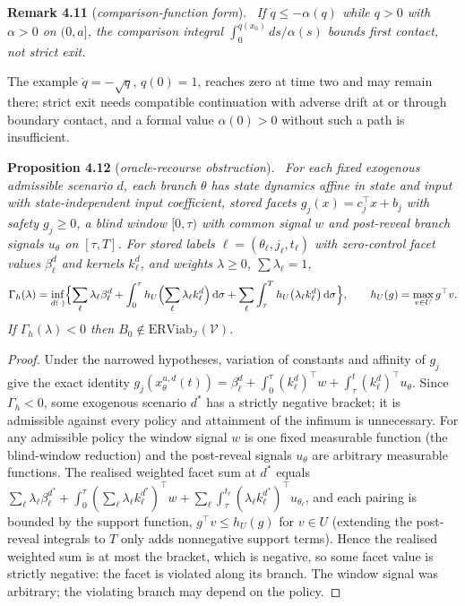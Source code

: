 \documentclass[11pt,a4paper]{article}
\theoremstyle{plain}
\theoremstyle{definition}
\theoremstyle{remark}
\newenvironment{restated}[2]{\par\medskip\noindent\textbf{#1} (\textit{#2}).\ \itshape}{\par\medskip}
\newcommand{\ERViab}{\mathrm{ERViab}}
\newcommand{\cV}{\mathcal{V}}
\newcommand{\cI}{\mathcal{I}}
\newcommand{\dd}{\,\mathrm{d}}
\begin{document}
\begin{restated}{Remark 4.11}{comparison-function form}
If $\dot q\le-\alpha(q)$ while $q>0$ with $\alpha>0$ on $(0,a]$, the comparison integral $\int_0^{q(x_0)}ds/\alpha(s)$ bounds first contact, not strict exit.
\end{restated}

The example $\dot q=-\sqrt q$, $q(0)=1$, reaches zero at time two and may remain there; strict exit needs compatible continuation with adverse drift at or through boundary contact, and a formal value $\alpha(0)>0$ without such a path is insufficient.

\begin{restated}{Proposition 4.12}{oracle-recourse obstruction}
For each fixed exogenous admissible scenario $d$, each branch $\theta$ has state dynamics affine in state and input with state-independent input coefficient, stored facets $g_j(x)=c_j^\top x+b_j$ with safety $g_j\ge0$, a blind window $[0,\tau)$ with common signal $w$ and post-reveal branch signals $u_\theta$ on $[\tau,T]$. For stored labels $\ell=(\theta_\ell,j_\ell,t_\ell)$ with zero-control facet values $\beta^d_\ell$ and kernels $k^d_\ell$, and weights $\lambda\ge0$, $\sum\lambda_\ell=1$,
\[
\Gamma_h(\lambda)=\inf_{d(\cdot)}\Bigl\{\sum_\ell\lambda_\ell\beta^d_\ell+\int_0^\tau h_U\Bigl(\sum_\ell\lambda_\ell k^d_\ell\Bigr)\dd\sigma+\sum_\ell\int_\tau^{T}h_U\bigl(\lambda_\ell k^d_\ell\bigr)\dd\sigma\Bigr\},\qquad h_U(g)=\max_{v\in U}g^\top v .
\]
If $\Gamma_h(\lambda)<0$ then $B_0\notin\ERViab_\cI(\cV)$.
\end{restated}

\begin{proof}
Under the narrowed hypotheses, variation of constants and affinity of $g_j$ give the exact identity $g_j(x^{u,d}_\theta(t))=\beta^d_\ell+\int_0^\tau(k^d_\ell)^\top w+\int_\tau^t(k^d_\ell)^\top u_\theta$. Since $\Gamma_h<0$, some exogenous scenario $d^*$ has a strictly negative bracket; it is admissible against every policy and attainment of the infimum is unnecessary. For any admissible policy the window signal $w$ is one fixed measurable function (the blind-window reduction) and the post-reveal signals $u_{\theta}$ are arbitrary measurable functions. The realised weighted facet sum at $d^*$ equals $\sum_\ell\lambda_\ell\beta^{d^*}_\ell+\int_0^\tau(\sum_\ell\lambda_\ell k^{d^*}_\ell)^\top w+\sum_\ell\int_\tau^{t_\ell}(\lambda_\ell k^{d^*}_\ell)^\top u_{\theta_\ell}$, and each pairing is bounded by the support function, $g^\top v\le h_U(g)$ for $v\in U$ (extending the post-reveal integrals to $T$ only adds nonnegative support terms). Hence the realised weighted sum is at most the bracket, which is negative, so some facet value is strictly negative: the facet is violated along its branch. The window signal was arbitrary; the violating branch may depend on the policy.
\end{proof}
\end{document}
